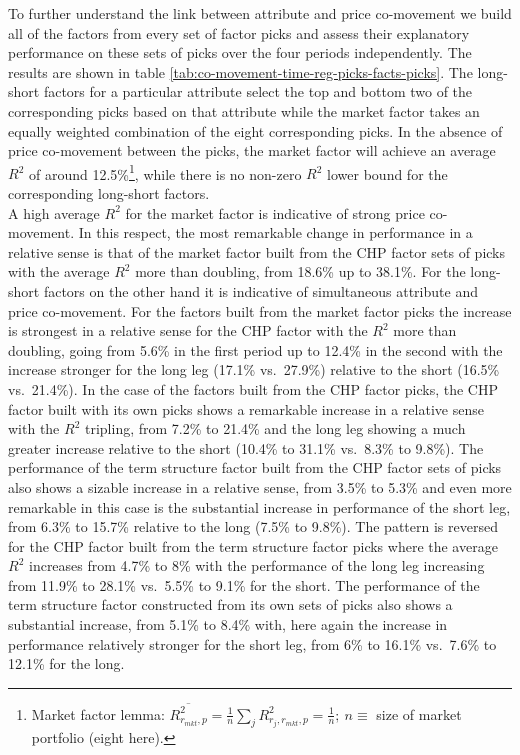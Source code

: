 \documentclass[]{elsarticle} %
\begin{document}
\medskip\setlength{\parindent}{0pt}

To further understand the link between attribute and price co-movement we build all of the factors from every set of factor picks and assess their explanatory performance on these sets of picks over the four periods independently. The results are shown in table \ref{tab:co-movement-time-reg-picks-facts-picks}. The long-short factors for a particular attribute select the top and bottom two of the corresponding picks based on that attribute while the market factor takes an equally weighted combination of the eight corresponding picks. In the absence of price co-movement between the picks, the market factor will achieve an average \(R^{2}\) of around 12.5\%\footnote{Market factor lemma: \(\overline{R_{r_{mkt}, p}^{2}} = \frac{1}{n} \sum_{j} R_{r_{j}, r_{mkt}, p}^{2} = \frac{1}{n}; \: n\equiv\) size of market portfolio (eight here).}, while there is no non-zero \(R^{2}\) lower bound for the corresponding long-short factors.\\
A high average \(R^{2}\) for the market factor is indicative of strong price co-movement. In this respect, the most remarkable change in performance in a relative sense is that of the market factor built from the CHP factor sets of picks with the average \(R^{2}\) more than doubling, from 18.6\% up to 38.1\%. For the long-short factors on the other hand it is indicative of simultaneous attribute and price co-movement. For the factors built from the market factor picks the increase is strongest in a relative sense for the CHP factor with the \(R^{2}\) more than doubling, going from 5.6\% in the first period up to 12.4\% in the second with the increase stronger for the long leg (17.1\% vs.~27.9\%) relative to the short (16.5\% vs.~21.4\%). In the case of the factors built from the CHP factor picks, the CHP factor built with its own picks shows a remarkable increase in a relative sense with the \(R^{2}\) tripling, from 7.2\% to 21.4\% and the long leg showing a much greater increase relative to the short (10.4\% to 31.1\% vs.~8.3\% to 9.8\%). The performance of the term structure factor built from the CHP factor sets of picks also shows a sizable increase in a relative sense, from 3.5\% to 5.3\% and even more remarkable in this case is the substantial increase in performance of the short leg, from 6.3\% to 15.7\% relative to the long (7.5\% to 9.8\%). The pattern is reversed for the CHP factor built from the term structure factor picks where the average \(R^{2}\) increases from 4.7\% to 8\% with the performance of the long leg increasing from 11.9\% to 28.1\% vs.~5.5\% to 9.1\% for the short. The performance of the term structure factor constructed from its own sets of picks also shows a substantial increase, from 5.1\% to 8.4\% with, here again the increase in performance relatively stronger for the short leg, from 6\% to 16.1\% vs.~7.6\% to 12.1\% for the long.\\
\end{document}

